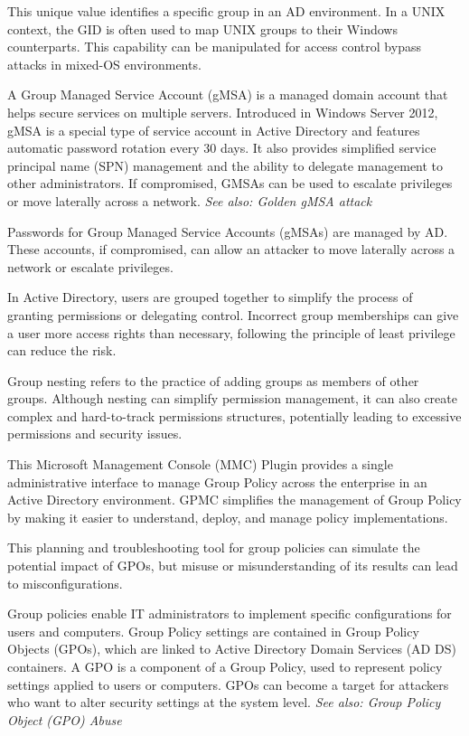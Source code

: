  This unique value identifies a specific group in an AD environment. In a UNIX context, the GID is often used to map UNIX groups to their Windows counterparts. This capability can be manipulated for access control bypass attacks in mixed-OS environments.

 A Group Managed Service Account (gMSA) is a managed domain account that helps secure services on multiple servers. Introduced in Windows Server 2012, gMSA is a special type of service account in Active Directory and features automatic password rotation every 30 days. It also provides simplified service principal name (SPN) management and the ability to delegate management to other administrators. If compromised, GMSAs can be used to escalate privileges or move laterally across a network.
\textit{See also: Golden gMSA attack}

 Passwords for Group Managed Service Accounts (gMSAs) are managed by AD. These accounts, if compromised, can allow an attacker to move laterally across a network or escalate privileges.

 In Active Directory, users are grouped together to simplify the process of granting permissions or delegating control. Incorrect group memberships can give a user more access rights than necessary, following the principle of least privilege can reduce the risk.

 Group nesting refers to the practice of adding groups as members of other groups. Although nesting can simplify permission management, it can also create complex and hard-to-track permissions structures, potentially leading to excessive permissions and security issues.

 This Microsoft Management Console (MMC) Plugin provides a single administrative interface to manage Group Policy across the enterprise in an Active Directory environment. GPMC simplifies the management of Group Policy by making it easier to understand, deploy, and manage policy implementations.

 This planning and troubleshooting tool for group policies can simulate the potential impact of GPOs, but misuse or misunderstanding of its results can lead to misconfigurations.

 Group policies enable IT administrators to implement specific configurations for users and computers. Group Policy settings are contained in Group Policy Objects (GPOs), which are linked to Active Directory Domain Services (AD DS) containers. A GPO is a component of a Group Policy, used to represent policy settings applied to users or computers. GPOs can become a target for attackers who want to alter security settings at the system level.
\textit{See also: Group Policy Object (GPO) Abuse}

